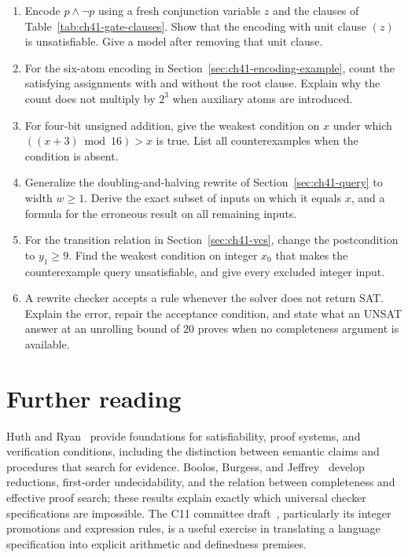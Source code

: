 \begin{enumerate}
\item\label{ex:ch41-root}
Encode $p\land\neg p$ using a fresh conjunction variable $z$ and the clauses of Table~\ref{tab:ch41-gate-clauses}.
Show that the encoding with unit clause $(z)$ is unsatisfiable.
Give a model after removing that unit clause.

\item\label{ex:ch41-projection}
For the six-atom encoding in Section~\ref{sec:ch41-encoding-example}, count the satisfying assignments with and without the root clause.
Explain why the count does not multiply by $2^3$ when auxiliary atoms are introduced.

\item\label{ex:ch41-overflow}
For four-bit unsigned addition, give the weakest condition on $x$ under which $((x+3)\bmod16)>x$ is true.
List all counterexamples when the condition is absent.

\item\label{ex:ch41-width}
Generalize the doubling-and-halving rewrite of Section~\ref{sec:ch41-query} to width $w\geq1$.
Derive the exact subset of inputs on which it equals $x$, and a formula for the erroneous result on all remaining inputs.

\item\label{ex:ch41-vc}
For the transition relation in Section~\ref{sec:ch41-vcs}, change the postcondition to $y_1\geq9$.
Find the weakest condition on integer $x_0$ that makes the counterexample query unsatisfiable, and give every excluded integer input.

\item\label{ex:ch41-unknown}
A rewrite checker accepts a rule whenever the solver does not return SAT.
Explain the error, repair the acceptance condition, and state what an UNSAT answer at an unrolling bound of $20$ proves when no completeness argument is available.
\end{enumerate}

\section{Further reading}
\label{sec:ch41-reading}

Huth and Ryan~\cite{huth-2004-logic} provide foundations for satisfiability, proof systems, and verification conditions, including the distinction between semantic claims and procedures that search for evidence.
Boolos, Burgess, and Jeffrey~\cite{boolos-2007-computability} develop reductions, first-order undecidability, and the relation between completeness and effective proof search; these results explain exactly which universal checker specifications are impossible.
The C11 committee draft~\cite{wg14-2011-c11}, particularly its integer promotions and expression rules, is a useful exercise in translating a language specification into explicit arithmetic and definedness premises.
